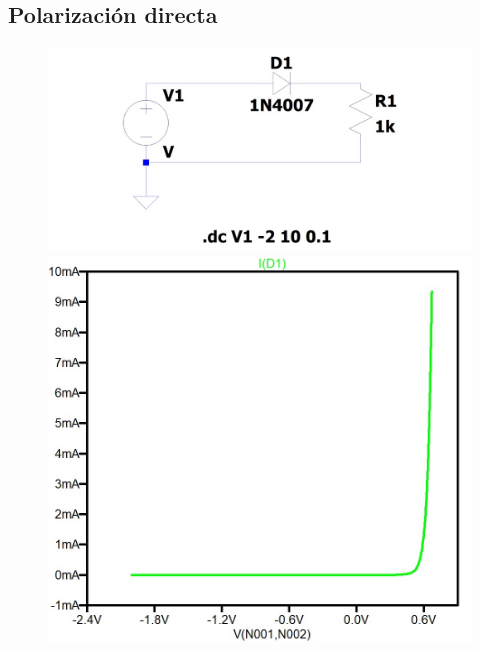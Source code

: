 \documentclass[chaptersright]{informeutn}
\begin{document}
    \subsection{Polarización directa}
    \begin{figure}[H]
      \centering
      \begin{minipage}{0.45\textwidth}
        \centering
        \includegraphics[width=\linewidth]{pictures/curva_diodo_silicio_circuito.jpeg}
      \end{minipage}
      \hfill
      \begin{minipage}{0.45\textwidth}
        \centering
        \includegraphics[width=\linewidth]{pictures/curva_diodo_silicio_grafico.jpeg}
      \end{minipage}
      \vspace{0.5cm}
      \label{c}
    \end{figure}
\end{document}
